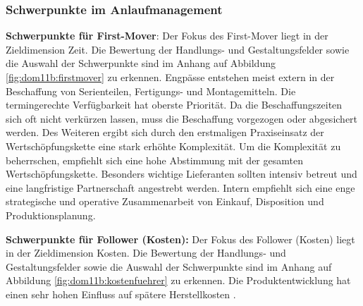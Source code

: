 \subsubsection{Schwerpunkte im Anlaufmanagement}

\textbf{Schwerpunkte für First-Mover}: Der Fokus des First-Mover liegt in der Zieldimension Zeit. 
Die Bewertung der Handlungs- und Gestaltungsfelder sowie die Auswahl der Schwerpunkte sind im Anhang auf Abbildung \ref{fig:dom11b:firstmover} zu erkennen. 
%
Engpässe entstehen meist extern in der Beschaffung von Serienteilen, Fertigungs- und Montagemitteln. Die termingerechte Verfügbarkeit hat oberste Priorität. Da die Beschaffungszeiten sich oft nicht verkürzen lassen, muss die Beschaffung vorgezogen oder abgesichert werden. 
Des Weiteren ergibt sich durch den erstmaligen Praxiseinsatz der Wertschöpfungskette eine stark erhöhte Komplexität. Um die Komplexität zu beherrschen, empfiehlt sich eine hohe Abstimmung mit der gesamten Wertschöpfungskette. 
Besonders wichtige Lieferanten sollten intensiv betreut und eine langfristige Partnerschaft angestrebt werden. 
Intern empfiehlt sich eine enge strategische und operative Zusammenarbeit von Einkauf, Disposition und Produktionsplanung. 

\textbf{Schwerpunkte für Follower (Kosten):} Der Fokus des Follower (Kosten) liegt in der Zieldimension Kosten. 
Die Bewertung der Handlungs- und Gestaltungsfelder sowie die Auswahl der Schwerpunkte sind im Anhang auf Abbildung \ref{fig:dom11b:kostenfuehrer} zu erkennen. 
%
Die Produktentwicklung hat einen sehr hohen Einfluss auf spätere Herstellkosten \cite[14]{Ehrlenspiel2014}. 

